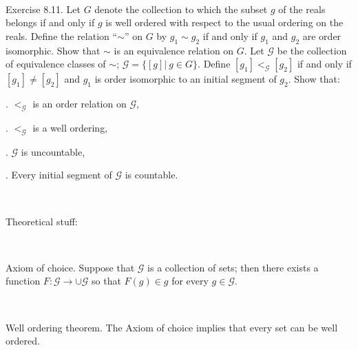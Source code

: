 \documentclass[12pt, std]{article}
\begin{document}
\

Exercise 8.11.  Let $G$ denote the collection to which the subset
$g$ of the reals belongs if and only if $g$ is well ordered with
respect to the usual ordering on the reals.  Define the relation
``$\sim$'' on $G$ by $g_1 \sim g_2$ if and only if $g_1$ and $g_2$
are order isomorphic.  Show that $\sim$ is an equivalence relation
on $G$. Let $\mathcal{G}$ be the collection of equivalence classes
of $\sim$; $\mathcal{G} = \{[g]| \ g \in G \}$.  Define $[g_1]
<_{\mathcal{G}} [g_2]$ if and only if $[g_1] \neq [g_2]$ and $g_1$
is order isomorphic to an initial segment of $g_2$.  Show that:

. $<_{\mathcal{G}}$ is an order relation on $\mathcal{G}$,

. $<_{\mathcal{G}}$ is a well ordering,

. $\mathcal{G}$ is uncountable,

. Every initial segment of $\mathcal{G}$ is countable.

\

Theoretical stuff:

\

Axiom of choice.  Suppose that $\mathcal{G}$ is a collection of
sets; then there exists a function $F: \mathcal{G} \rightarrow \cup
\mathcal{G}$ so that $F(g) \in g$ for every $g \in \mathcal{G}$.

\

Well ordering theorem.  The Axiom of choice implies that every set
can be well ordered.
\end{document}
